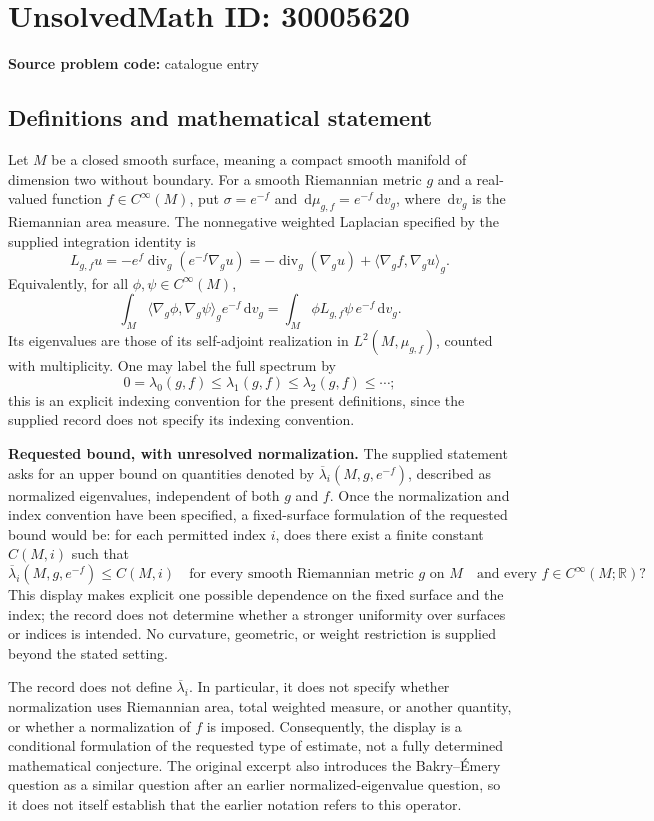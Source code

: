 \documentclass[11pt]{article}
\newcommand{\R}{\mathbb{R}}
\newcommand{\dd}{\,\mathrm{d}}
\begin{document}
\section*{UnsolvedMath ID: 30005620}
\textbf{Source problem code:} catalogue entry
\subsection{Definitions and mathematical statement}
Let \(M\) be a closed smooth surface, meaning a compact smooth manifold of dimension two without boundary. For a smooth Riemannian metric \(g\) and a real-valued function \(f\in C^\infty(M)\), put \(\sigma=e^{-f}\) and \(\dd\mu_{g,f}=e^{-f}\dd v_g\), where \(\dd v_g\) is the Riemannian area measure. The nonnegative weighted Laplacian specified by the supplied integration identity is
\[
L_{g,f}u=-e^f\operatorname{div}_g(e^{-f}\nabla_g u)
=-\operatorname{div}_g(\nabla_g u)+\langle\nabla_g f,\nabla_g u\rangle_g.
\]
Equivalently, for all \(\phi,\psi\in C^\infty(M)\),
\[
\int_M\langle\nabla_g\phi,\nabla_g\psi\rangle_g e^{-f}\dd v_g
=\int_M\phi L_{g,f}\psi\,e^{-f}\dd v_g.
\]
Its eigenvalues are those of its self-adjoint realization in \(L^2(M,\mu_{g,f})\), counted with multiplicity. One may label the full spectrum by
\[
0=\lambda_0(g,f)\leq\lambda_1(g,f)\leq\lambda_2(g,f)\leq\cdots;
\]
this is an explicit indexing convention for the present definitions, since the supplied record does not specify its indexing convention.

\textbf{Requested bound, with unresolved normalization.} The supplied statement asks for an upper bound on quantities denoted by \(\overline\lambda_i(M,g,e^{-f})\), described as normalized eigenvalues, independent of both \(g\) and \(f\). Once the normalization and index convention have been specified, a fixed-surface formulation of the requested bound would be: for each permitted index \(i\), does there exist a finite constant \(C(M,i)\) such that
\[
\overline\lambda_i(M,g,e^{-f})\leq C(M,i)
\quad\text{for every smooth Riemannian metric }g\text{ on }M
\quad\text{and every }f\in C^\infty(M;\R)?
\]
This display makes explicit one possible dependence on the fixed surface and the index; the record does not determine whether a stronger uniformity over surfaces or indices is intended. No curvature, geometric, or weight restriction is supplied beyond the stated setting.

The record does not define \(\overline\lambda_i\). In particular, it does not specify whether normalization uses Riemannian area, total weighted measure, or another quantity, or whether a normalization of \(f\) is imposed. Consequently, the display is a conditional formulation of the requested type of estimate, not a fully determined mathematical conjecture. The original excerpt also introduces the Bakry--\'Emery question as a similar question after an earlier normalized-eigenvalue question, so it does not itself establish that the earlier notation refers to this operator.
\end{document}

